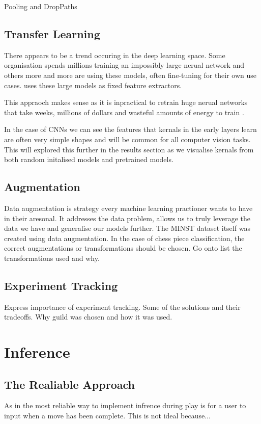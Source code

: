 Pooling and DropPaths

\subsection{Transfer Learning}
There appears to be a trend occuring in the deep learning space.  Some organisation spends millions training an impossibly large nerual network
and others more and more are using these models, often fine-tuning for their own use cases.  \cite{} uses these large models as fixed feature extractors.

This appraoch makes sense as it is inpractical to retrain huge nerual networks that take weeks, millions of dollars and wasteful amounts of energy
to train \cite{}.

In the case of CNNs we can see the features that kernals in the early layers learn \cite{} are often very simple shapes and will be common for all
computer vision tasks.  This will explored this further in the results section as we visualise kernals from both random initalised models and 
pretrained models.

\subsection{Augmentation}
Data augmentation is strategy every machine learning practioner wants to have in their aresonal.  It addresses the data problem, allows us to truly 
leverage the data we have and generalise our models further.  The MINST \cite{} dataset itself was created using data augmentation.
In the case of chess piece classification, the correct augmentations or transformations should be chosen.
Go onto list the transformations used and why.

\subsection{Experiment Tracking}
Express importance of experiment tracking.  Some of the solutions \cite{} and their tradeoffs.
Why guild was chosen and how it was used.


\section{Inference}

\subsection{The Realiable Approach}
As in \cite{} the most reliable way to implement infrence during play is for a user to input when a move
has been complete.
This is not ideal because...

